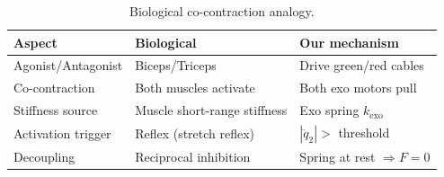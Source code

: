 \documentclass[11pt, a4paper]{article}
\begin{document}
\begin{table}[h]
\centering
\begin{tabular}{@{}lll@{}}
\toprule
\textbf{Aspect} & \textbf{Biological} & \textbf{Our mechanism} \\
\midrule
Agonist/Antagonist  & Biceps/Triceps         & Drive green/red cables \\
Co-contraction      & Both muscles activate  & Both exo motors pull \\
Stiffness source    & Muscle short-range stiffness & Exo spring $k_{\text{exo}}$ \\
Activation trigger  & Reflex (stretch reflex) & $|\ddot{q}_2| > $ threshold \\
Decoupling          & Reciprocal inhibition   & Spring at rest $\Rightarrow F=0$ \\
\bottomrule
\end{tabular}
\caption{Biological co-contraction analogy.}
\label{tab:bio}
\end{table}
\end{document}
